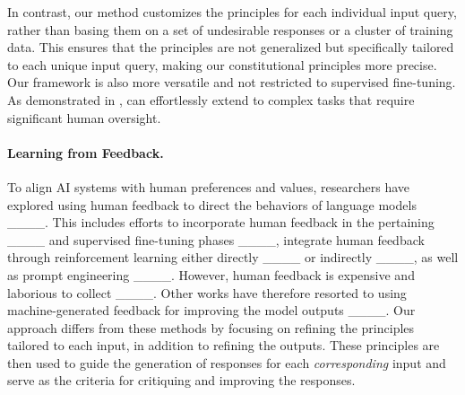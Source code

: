In contrast, our method customizes the principles for each individual input query, rather than basing them on a set of undesirable responses or a cluster of training data. This ensures that the principles are not generalized but specifically tailored to each unique input query, making our constitutional principles more precise. Our framework is also more versatile and not restricted to supervised fine-tuning. As demonstrated in , \ourframework{} can effortlessly extend to complex tasks that require significant human oversight.

\paragraph{Learning from Feedback.} To align AI systems with human preferences and values, researchers have explored using human feedback to direct the behaviors of language models ____. This includes efforts to incorporate human feedback in the pertaining ____ and supervised fine-tuning phases ____, integrate human feedback through reinforcement learning either directly ____ or indirectly ____, as well as prompt engineering ____. However, human feedback is expensive and laborious to collect ____. Other works have therefore resorted to using machine-generated feedback for improving the model outputs ____. Our approach differs from these methods by focusing on refining the principles tailored to each input, in addition to refining the outputs. These principles are then used to guide the generation of responses for each \emph{corresponding} input and serve as the criteria for critiquing and improving the responses.
